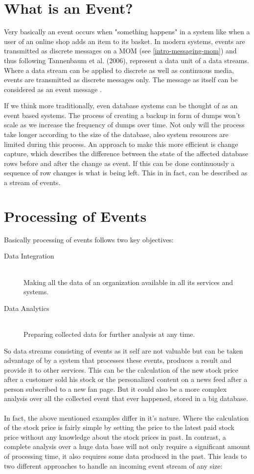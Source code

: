 \section{What is an Event?}
\label{intro-datastream-datastream}
Very basically an event occurs when "something happens"  in a system
like when a user of an online shop adds an item to its basket. In modern systems, events are transmitted as discrete messages on a MOM (see \ref{intro-messaging-mom}) and thus
following Tannenbaum et al. (2006), represent a data unit of a data streams. 
Where a data stream can be applied to discrete as well as continuous media, events are
transmitted as discrete messages only. The message as itself can
be considered as an event message \cite{EIP03}.

If we think more traditionally, even database systems can be thought of as
an event based systems. The process of creating a backup in form of dumps won't scale
as we increase the frequency of dumps over time. Not only will the process take
longer according to the size of the database, also system resources are limited
during this process. An approach to make this more efficient  is change capture,
which describes the difference between the state of the affected database rows
before and after the change as event. If this can be done continuously a sequence of
row changes is what is being left. This in in fact, can be described as a stream
of events.

\section{Processing of Events}
Basically processing of events follows two key objectives: 
\begin{description}
    \item [Data Integration] \hfill \\ Making all the data of an organization available in all its services and systems.
    \item [Data Analytics]  \hfill \\ Preparing collected data for further analysis at any time. 
\end{description}

So data streams consisting of events as it self are not valuable but
can be taken advantage of by a system that processes these events, produces a
result and provide it to other services. This can be the calculation of the new
stock price after a customer sold his stock or the personalized content on a
news feed after a person subscribed to a new fan page. But it could also be a
more complex analysis over all the collected event that ever happened, stored in
a big database. 
\\ \\
In fact, the above mentioned examples differ in it's nature. Where the
calculation of the stock price is fairly simple by setting the price to the
latest paid stock price without any knowledge about the stock prices in past. 
In contrast, a complete analysis over a huge data base will not only require a
significant amount of processing time, it also requires some data produced in the
past. This leads to two different approaches to handle an incoming event stream
of any size: 

